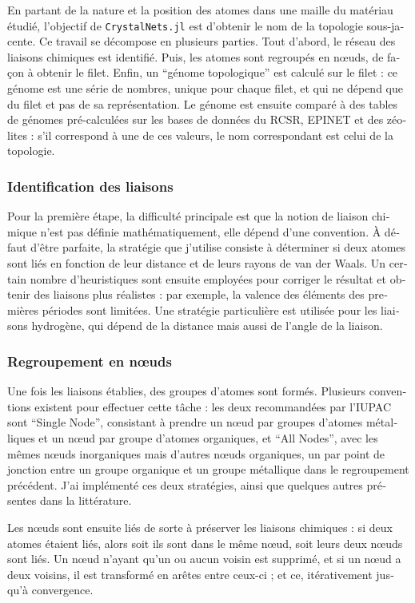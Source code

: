 \documentclass[thesis]{subfiles}
\begin{document}
\begin{otherlanguage}{french}
En partant de la nature et la position des atomes dans une maille du matériau étudié, l'objectif de \texttt{CrystalNets.jl} est d'obtenir le nom de la topologie sous-jacente. Ce travail se décompose en plusieurs parties. Tout d'abord, le réseau des liaisons chimiques est identifié. Puis, les atomes sont regroupés en n\oe uds, de façon à obtenir le filet. Enfin, un ``génome topologique'' est calculé sur le filet : ce génome est une série de nombres, unique pour chaque filet, et qui ne dépend que du filet et pas de sa représentation. Le génome est ensuite comparé à des tables de génomes pré-calculées sur les bases de données du RCSR, EPINET et des zéolites : s'il correspond à une de ces valeurs, le nom correspondant est celui de la topologie.

\subsubsection{Identification des liaisons}

Pour la première étape, la difficulté principale est que la notion de liaison chimique n'est pas définie mathématiquement, elle dépend d'une convention. À défaut d'être parfaite, la stratégie que j'utilise consiste à déterminer si deux atomes sont liés en fonction de leur distance et de leurs rayons de van der Waals. Un certain nombre d'heuristiques sont ensuite employées pour corriger le résultat et obtenir des liaisons plus réalistes : par exemple, la valence des éléments des premières périodes sont limitées. Une stratégie particulière est utilisée pour les liaisons hydrogène, qui dépend de la distance mais aussi de l'angle de la liaison.

\subsubsection{Regroupement en n\oe uds}

Une fois les liaisons établies, des groupes d'atomes sont formés. Plusieurs conventions existent pour effectuer cette tâche : les deux recommandées par l'IUPAC sont ``Single Node'', consistant à prendre un n\oe ud par groupes d'atomes métalliques et un n\oe ud par groupe d'atomes organiques, et ``All Nodes'', avec les mêmes n\oe uds inorganiques mais d'autres n\oe uds organiques, un par point de jonction entre un groupe organique et un groupe métallique dans le regroupement précédent. J'ai implémenté ces deux stratégies, ainsi que quelques autres présentes dans la littérature.

Les n\oe uds sont ensuite liés de sorte à préserver les liaisons chimiques : si deux atomes étaient liés, alors soit ils sont dans le même n\oe ud, soit leurs deux n\oe uds sont liés. Un n\oe ud n'ayant qu'un ou aucun voisin est supprimé, et si un n\oe ud a deux voisins, il est transformé en arêtes entre ceux-ci ; et ce, itérativement jusqu'à convergence.


\end{otherlanguage}
\end{document}
